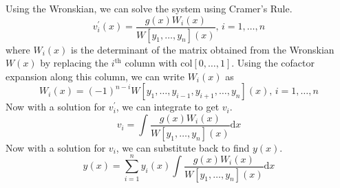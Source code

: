 \noindent
Using the Wronskian, we can solve the system using Cramer's Rule.
\begin{equation*}
	v^\prime_i(x) = \frac{g(x)W_i(x)}{W[y_1, \ldots, y_n](x)} \text{, } i = 1, \ldots, n
\end{equation*}
where $W_i(x)$ is the determinant of the matrix obtained from the Wronskian $W(x)$ by replacing the $i^{\text{th}}$ column with $\text{col}[0, \ldots, 1]$. Using the cofactor expansion along this column, we can write $W_i(x)$ as
\begin{equation*}
	W_i(x) = (-1)^{n-i}W[y_1, \ldots, y_{i-1}, y_{i+1}, \ldots, y_n](x) \text{, } i = 1, \ldots, n
\end{equation*}
Now with a solution for $v_i^\prime$, we can integrate to get $v_i$.
\begin{equation*}
	v_i = \int{\frac{g(x)W_i(x)}{W[y_1, \ldots, y_n](x)} \mathrm{d}x}
\end{equation*}
Now with a solution for $v_i$, we can substitute back to find $y(x)$.
\begin{equation*}
	y(x) = \sum_{i=1}^{n}{y_i(x)\int{\frac{g(x)W_i(x)}{W[y_1, \ldots, y_n](x)} \mathrm{d}x}}
\end{equation*}

\ifodd{}\fi